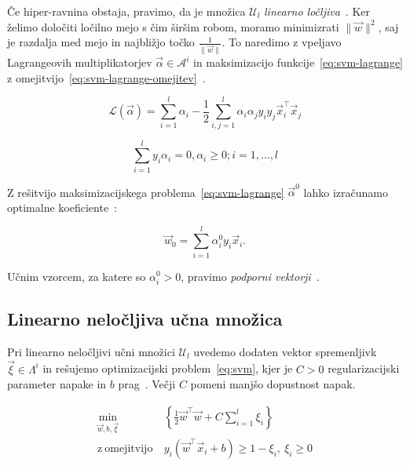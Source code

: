 Če hiper-ravnina obstaja, pravimo, da je množica $\mathcal{U}_l$ \emph{linearno ločljiva}~\cite{chapelle1999support}. Ker želimo določiti ločilno mejo s čim širšim robom, moramo minimizrati $\|\vec{w}\|^2$, saj je razdalja med mejo in najbližjo točko $\frac{1}{\|\vec{w}\|}$. To naredimo z vpeljavo Lagrangeovih multiplikatorjev $\vec{\alpha} \in \mathcal{A}^i$ in maksimizacijo funkcije~\eqref{eq:svm-lagrange} z omejitvijo~\eqref{eq:svm-lagrange-omejitev}~\cite{chapelle1999support}.

\begin{equation}\label{eq:svm-lagrange}
	\mathcal{L}(\vec{\alpha}) = \sum_{i=1}^l \alpha_i - \frac{1}{2}\sum_{i,j=1}^l \alpha_i\alpha_j y_i y_j \vec{x}_i^\top\vec{x}_j
\end{equation}

\begin{equation}\label{eq:svm-lagrange-omejitev}
	\sum_{i=1}^ly_i\alpha_i = 0, \alpha_i \geq 0; i=1, \ldots, l
\end{equation}

Z rešitvijo maksimizacijskega problema~\eqref{eq:svm-lagrange} $\vec{\alpha}^0$ lahko izračunamo optimalne koeficiente~\cite{chapelle1999support}:

\begin{equation}
	\vec{w}_0 = \sum_{i=1}^l \alpha_i^0 y_i \vec{x}_i.
\end{equation}

Učnim vzorcem, za katere so $\alpha_i^0 > 0$, pravimo \emph{podporni vektorji}~\cite{chapelle1999support}.









\subsection{Linearno neločljiva učna množica}
Pri linearno neločljivi učni množici $\mathcal{U}_l$ uvedemo dodaten vektor spremenljivk $\vec{\xi} \in \mathit{\Lambda}^i$ in rešujemo optimizacijski problem~\eqref{eq:svm}, kjer je $C>0$ regularizacijski parameter napake in $b$ prag~\cite{chapelle1999support}. Večji $C$ pomeni manjšo dopustnost napak. 

\begin{equation}\label{eq:svm}
\begin{aligned}
\min_{\vec{w}, b, \vec{\xi}} &~ \left\{ \frac{1}{2} \vec{w}^\top\vec{w} + C \sum_{i=1}^l\xi_i \right\}\\
    \mathrm{z~omejitvijo} &~ y_i \left( \vec{w}^\top \vec{x}_i + b \right) \geq 1 - \xi_i,~ 
    \xi_i \geq 0
\end{aligned}	
\end{equation}








